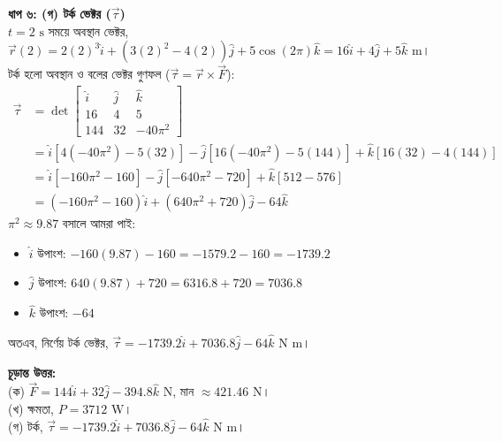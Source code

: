 \documentclass[12pt, a4paper]{article}
\begin{document}
\begin{tcolorbox}[solutionbox={সমাধান (Solution)}]
\vspace{1em}
\noindent
\textbf{ধাপ ৬: (গ) টর্ক ভেক্টর ($\vec{\tau}$)} \\
$t = 2\text{ s}$ সময়ে অবস্থান ভেক্টর, $\vec{r}(2) = 2(2)^3\hat{i} + (3(2)^2 - 4(2))\hat{j} + 5\cos(2\pi)\hat{k} = 16\hat{i} + 4\hat{j} + 5\hat{k} \text{ m}$। \\
টর্ক হলো অবস্থান ও বলের ভেক্টর গুণফল ($\vec{\tau} = \vec{r} \times \vec{F}$):
\begin{align*}
\vec{\tau} &= \det \begin{bmatrix} 
\hat{i} & \hat{j} & \hat{k} \\ 
16 & 4 & 5 \\ 
144 & 32 & -40\pi^2 
\end{bmatrix} \\
&= \hat{i} \left[ 4(-40\pi^2) - 5(32) \right] - \hat{j} \left[ 16(-40\pi^2) - 5(144) \right] + \hat{k} \left[ 16(32) - 4(144) \right] \\
&= \hat{i} \left[ -160\pi^2 - 160 \right] - \hat{j} \left[ -640\pi^2 - 720 \right] + \hat{k} \left[ 512 - 576 \right] \\
&= (-160\pi^2 - 160)\hat{i} + (640\pi^2 + 720)\hat{j} - 64\hat{k}
\end{align*}
$\pi^2 \approx 9.87$ বসালে আমরা পাই:
\begin{itemize}[leftmargin=*, parsep=0.2ex]
    \item $\hat{i}$ উপাংশ: $-160(9.87) - 160 = -1579.2 - 160 = -1739.2$
    \item $\hat{j}$ উপাংশ: $640(9.87) + 720 = 6316.8 + 720 = 7036.8$
    \item $\hat{k}$ উপাংশ: $-64$
\end{itemize}
অতএব, নির্ণেয় টর্ক ভেক্টর, $\vec{\tau} = -1739.2\hat{i} + 7036.8\hat{j} - 64\hat{k} \text{ N m}$।

\vspace{1em}
\begin{tcolorbox}[answerbox]
\textbf{চূড়ান্ত উত্তর:} \\
(ক) $\vec{F} = 144\hat{i} + 32\hat{j} - 394.8\hat{k} \text{ N}$, মান $\approx 421.46\text{ N}$। \\
(খ) ক্ষমতা, $P = 3712\text{ W}$। \\
(গ) টর্ক, $\vec{\tau} = -1739.2\hat{i} + 7036.8\hat{j} - 64\hat{k} \text{ N m}$।
\end{tcolorbox}
\end{tcolorbox}
\end{document}
